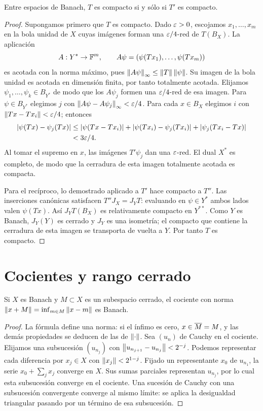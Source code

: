 \begin{teorema}[Schauder]\label{v3:schauder}
Entre espacios de Banach, $T$ es compacto si y sólo si $T'$ es compacto.
\end{teorema}
\begin{proof}
Supongamos primero que $T$ es compacto. Dado $\varepsilon>0$, escojamos $x_1,\ldots,x_m$ en la bola unidad de $X$ cuyas imágenes forman una $\varepsilon/4$-red de $T(B_X)$. La aplicación
\[A:Y^*\to\mathbb F^m,\qquad A\psi=(\psi(Tx_1),\ldots,\psi(Tx_m))
\]
es acotada con la norma máximo, pues $\left\lVert A\psi\right\rVert_\infty\le\left\lVert T\right\rVert\left\lVert\psi\right\rVert$. Su imagen de la bola unidad es acotada en dimensión finita, por tanto totalmente acotada. Elijamos $\psi_1,\ldots,\psi_k\in B_{Y^*}$ de modo que los $A\psi_j$ formen una $\varepsilon/4$-red de esa imagen. Para $\psi\in B_{Y^*}$ elegimos $j$ con $\left\lVert A\psi-A\psi_j\right\rVert_\infty<\varepsilon/4$. Para cada $x\in B_X$ elegimos $i$ con $\left\lVert Tx-Tx_i\right\rVert<\varepsilon/4$; entonces
\begin{align*}
|\psi(Tx)-\psi_j(Tx)|
&\le|\psi(Tx-Tx_i)|+|\psi(Tx_i)-\psi_j(Tx_i)|+|\psi_j(Tx_i-Tx)|\\
&<3\varepsilon/4.
\end{align*}
Al tomar el supremo en $x$, las imágenes $T'\psi_j$ dan una $\varepsilon$-red. El dual $X^*$ es completo, de modo que la cerradura de esta imagen totalmente acotada es compacta.

Para el recíproco, lo demostrado aplicado a $T'$ hace compacto a $T''$. Las inserciones canónicas satisfacen $T''J_X=J_YT$: evaluando en $\psi\in Y^*$ ambos lados valen $\psi(Tx)$. Así $J_YT(B_X)$ es relativamente compacto en $Y^{**}$. Como $Y$ es Banach, $J_Y(Y)$ es cerrado y $J_Y$ es una isometría; el compacto que contiene la cerradura de esta imagen se transporta de vuelta a $Y$. Por tanto $T$ es compacto.
\end{proof}

\section{Cocientes y rango cerrado}
\begin{lema}\label{v3:cociente-banach}
Si $X$ es Banach y $M\subset X$ es un subespacio cerrado, el cociente con norma $\left\lVert x+M\right\rVert=\inf_{m\in M}\left\lVert x-m\right\rVert$ es Banach.
\end{lema}
\begin{proof}
La fórmula define una norma: si el ínfimo es cero, $x\in\overline{M}=M$, y las demás propiedades se deducen de las de $\left\lVert\cdot\right\rVert$. Sea $(u_n)$ de Cauchy en el cociente. Elijamos una subsucesión $(u_{n_j})$ con $\left\lVert u_{n_{j+1}}-u_{n_j}\right\rVert<2^{-j}$. Podemos representar cada diferencia por $x_j\in X$ con $\left\lVert x_j\right\rVert<2^{1-j}$. Fijado un representante $x_0$ de $u_{n_1}$, la serie $x_0+\sum_jx_j$ converge en $X$. Sus sumas parciales representan $u_{n_j}$, por lo cual esta subsucesión converge en el cociente. Una sucesión de Cauchy con una subsucesión convergente converge al mismo límite: se aplica la desigualdad triangular pasando por un término de esa subsucesión.
\end{proof}

